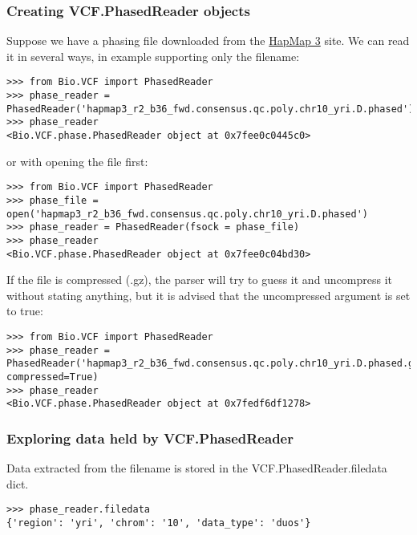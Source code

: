 \subsubsection{Creating VCF.PhasedReader objects}

\noindent Suppose we have a phasing file downloaded from the \href{ftp://ftp.hapmap.org/hapmap/phasing/2009-02\_phaseIII/HapMap3\_r2/}{HapMap 3} site.
We can read it in several ways, in example supporting only the filename:

\begin{verbatim}
>>> from Bio.VCF import PhasedReader
>>> phase_reader = PhasedReader('hapmap3_r2_b36_fwd.consensus.qc.poly.chr10_yri.D.phased')
>>> phase_reader
<Bio.VCF.phase.PhasedReader object at 0x7fee0c0445c0>

\end{verbatim}

\noindent or with opening the file first:

\begin{verbatim}
>>> from Bio.VCF import PhasedReader
>>> phase_file = open('hapmap3_r2_b36_fwd.consensus.qc.poly.chr10_yri.D.phased')
>>> phase_reader = PhasedReader(fsock = phase_file)
>>> phase_reader
<Bio.VCF.phase.PhasedReader object at 0x7fee0c04bd30>

\end{verbatim}

\noindent If the file is compressed (.gz), the parser will try to guess it and uncompress it without stating anything, but it is advised that the uncompressed argument is set
to true:

\begin{verbatim}
>>> from Bio.VCF import PhasedReader
>>> phase_reader = PhasedReader('hapmap3_r2_b36_fwd.consensus.qc.poly.chr10_yri.D.phased.gz',
compressed=True)
>>> phase_reader
<Bio.VCF.phase.PhasedReader object at 0x7fedf6df1278>

\end{verbatim}

\subsubsection{Exploring data held by VCF.PhasedReader}

\noindent Data extracted from the filename is stored in the VCF.PhasedReader.filedata dict.

\begin{verbatim}
>>> phase_reader.filedata
{'region': 'yri', 'chrom': '10', 'data_type': 'duos'}

\end{verbatim}

